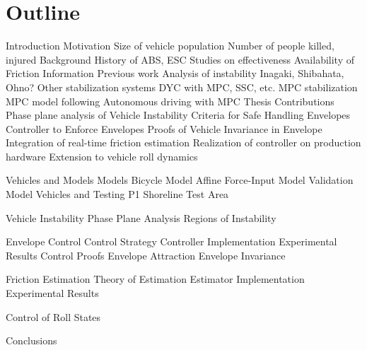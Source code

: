 \documentclass[12pt]{article}
\begin{document}
\section{Outline}
\begin{outline}[enumerate]
\1 Introduction
\2 Motivation
\3 Size of vehicle population
\3 Number of people killed, injured
\2 Background
\3 History of ABS, ESC
\3 Studies on effectiveness
\3 Availability of Friction Information
\2 Previous work
\3 Analysis of instability
\4 Inagaki, Shibahata, Ohno?
\3 Other stabilization systems
\4 DYC with MPC, SSC, etc.
\3 MPC stabilization
\4 MPC model following
\4 Autonomous driving with MPC
\2 Thesis Contributions
\3 Phase plane analysis of Vehicle Instability
\3 Criteria for Safe Handling Envelopes
\3 Controller to Enforce Envelopes
\3 Proofs of Vehicle Invariance in Envelope
\3 Integration of real-time friction estimation
\3 Realization of controller on production hardware
\3 Extension to vehicle roll dynamics

\1 Vehicles and Models
\2 Models
\3 Bicycle Model
\3 Affine Force-Input Model
\3 Validation Model
\2 Vehicles and Testing
\3 P1
\3 Shoreline Test Area

\1 Vehicle Instability
\2 Phase Plane Analysis
\2 Regions of Instability

\1 Envelope Control
\2 Control Strategy
\2 Controller Implementation
\2 Experimental Results
\2 Control Proofs
\3 Envelope Attraction
\3 Envelope Invariance

\1 Friction Estimation
\2 Theory of Estimation
\2 Estimator Implementation
\2 Experimental Results

\1 Control of Roll States

\1 Conclusions
\end{outline}
\end{document}
